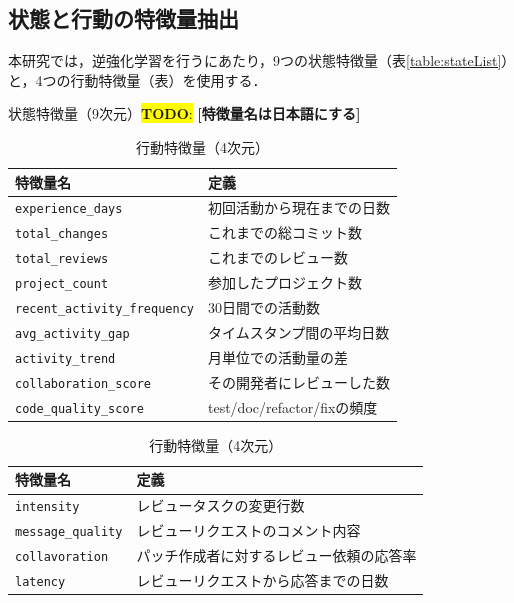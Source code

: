 \documentclass[submit,techrep,noauthor]{ipsj}
\newcommand{\todo}[1]{\colorbox{yellow}{{\bf TODO}:}{\color{red} {\textbf{[#1]}}}}
\begin{document}
\subsection{状態と行動の特徴量抽出}
本研究では，逆強化学習を行うにあたり，9つの状態特徴量（表\ref{table:stateList}）と，4つの行動特徴量（表\label{table:actionList}）を使用する．
\begin{table}[t]
    \centering
    \label{table:stateList}
    \caption{状態特徴量（9次元）\todo{特徴量名は日本語にする}}
    \begin{tabular}{@{}ll@{}}
        \toprule
        \textbf{特徴量名} & \textbf{定義} \\
        \midrule
        \texttt{experience\_days} & 初回活動から現在までの日数 \\
        \texttt{total\_changes} & これまでの総コミット数 \\
        \texttt{total\_reviews} & これまでのレビュー数 \\
        \texttt{project\_count} & 参加したプロジェクト数 \\
        \texttt{recent\_activity\_frequency} & 30日間での活動数 \\
        \texttt{avg\_activity\_gap} & タイムスタンプ間の平均日数 \\
        \texttt{activity\_trend} & 月単位での活動量の差\\
        \texttt{collaboration\_score} & その開発者にレビューした数 \\ 
        \texttt{code\_quality\_score} & test/doc/refactor/fixの頻度 \\
        \bottomrule
    \end{tabular}

\vspace{2mm}

    \centering
    \caption{行動特徴量（4次元）}
        \begin{tabular}{@{}ll@{}}
        \toprule
        \label{table:actionList}
        \textbf{特徴量名} & \textbf{定義} \\
        \midrule
        \texttt{intensity} & レビュータスクの変更行数 \\
        \texttt{message\_quality} & レビューリクエストのコメント内容 \\
        \texttt{collavoration} & パッチ作成者に対するレビュー依頼の応答率 \\
        \texttt{latency} & レビューリクエストから応答までの日数 \\
        \bottomrule
    \end{tabular}
\end{table}
\end{document}
